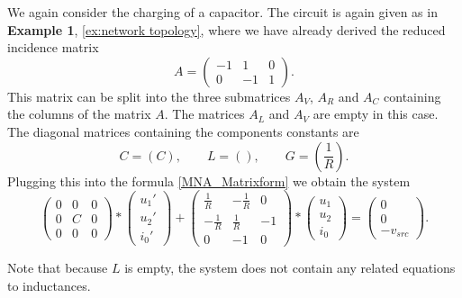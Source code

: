 \begin{example}
	\label{ex:MNA}
	We again consider the charging of a capacitor. The circuit is again given as in \textbf{Example 1}, \ref{ex:network topology}, where we have already derived the reduced incidence matrix
	\begin{displaymath}
		A = 
		\left(
		\begin{matrix}
			-1 & 1 & 0 \\
			0 & -1 & 1 
		\end{matrix}
		\right).
	\end{displaymath} 
	This matrix can be split into the three submatrices $A_V$, $A_R$ and $A_C$ containing the columns of the matrix $A$. The matrices $A_L$ and $A_V$ are empty in this case. The diagonal matrices containing the components constants are
	\begin{displaymath}
		C = (C), \qquad L = (), \qquad G = (\frac{1}{R}).
	\end{displaymath}
	Plugging this into the formula \eqref{MNA_Matrixform} we obtain the system
	\begin{displaymath}
		\begin{pmatrix}
			0 & 0 & 0 \\
			0 & C & 0 \\
			0 & 0 & 0
		\end{pmatrix}
		*
		\begin{pmatrix}
			u_1' \\
			u_2' \\
			i_0'
		\end{pmatrix}
		+
		\begin{pmatrix}
			\frac{1}{R} & -\frac{1}{R} & 0 \\
			-\frac{1}{R} & \frac{1}{R} & -1 \\
			0 & -1 & 0 
		\end{pmatrix}
		*
		\begin{pmatrix}
			u_1 \\
			u_2 \\
			i_0
		\end{pmatrix}
		=
		\begin{pmatrix}
			0 \\
			0 \\
			-v_{src}
		\end{pmatrix}.
	\end{displaymath}
	
	Note that because $L$ is empty, the system does not contain any related equations to inductances.
\end{example}


